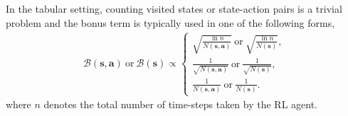 \label{sec:count-based-tabular}
In the tabular setting, counting visited states or state-action pairs is a trivial problem and the bonus term is typically used in one of the following forms, 
\begin{align}\label{eq:bonus-forms-tabular}
   \mathcal{B}(\textbf{s},\textbf{a})~\text{or}~\mathcal{B}(\textbf{s}) \propto  
\begin{cases}
\sqrt{\frac{\ln{n}}{N(\textbf{s},\textbf{a})}}~\text{or}~\sqrt{\frac{\ln{n}}{N(\textbf{s})}},\\    
\frac{1}{\sqrt{N(\textbf{s},\textbf{a})}}~\text{or}~\frac{1}{\sqrt{N(\textbf{s})}},\\
\frac{1}{N(\textbf{s},\textbf{a})}~\text{or}~\frac{1}{N(\textbf{s})}.
\end{cases}
\end{align}
where $n$ denotes the total number of time-steps taken by the RL agent.
